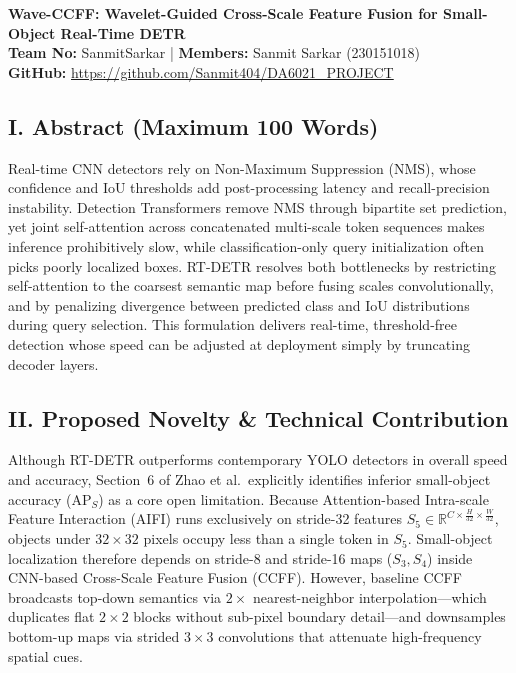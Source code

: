 \documentclass[8pt,a4paper]{article}
\begin{document}
\thispagestyle{empty}

\begin{center}

{\large\bfseries
Wave-CCFF: Wavelet-Guided Cross-Scale Feature Fusion for Small-Object Real-Time DETR}\\[4pt]

\textbf{Team No:} SanmitSarkar
\quad | \quad
\textbf{Members:}
Sanmit Sarkar (230151018)\\[3pt]

\textbf{GitHub:}
\url{https://github.com/Sanmit404/DA6021_PROJECT}

\end{center}

\vspace{-5pt}

\subsection*{I. Abstract (Maximum 100 Words)}
Real-time CNN detectors rely on Non-Maximum Suppression (NMS), whose confidence and IoU thresholds add post-processing latency and recall-precision instability. Detection Transformers remove NMS through bipartite set prediction, yet joint self-attention across concatenated multi-scale token sequences makes inference prohibitively slow, while classification-only query initialization often picks poorly localized boxes. RT-DETR resolves both bottlenecks by restricting self-attention to the coarsest semantic map before fusing scales convolutionally, and by penalizing divergence between predicted class and IoU distributions during query selection. This formulation delivers real-time, threshold-free detection whose speed can be adjusted at deployment simply by truncating decoder layers.

\subsection*{II. Proposed Novelty \& Technical Contribution}
Although RT-DETR outperforms contemporary YOLO detectors in overall speed and accuracy, Section~6 of Zhao et al.\ explicitly identifies inferior small-object accuracy ($\text{AP}_S$) as a core open limitation. Because Attention-based Intra-scale Feature Interaction (AIFI) runs exclusively on stride-32 features $S_5 \in \mathbb{R}^{C \times \frac{H}{32} \times \frac{W}{32}}$, objects under $32 \times 32$ pixels occupy less than a single token in $S_5$. Small-object localization therefore depends on stride-8 and stride-16 maps ($S_3, S_4$) inside CNN-based Cross-Scale Feature Fusion (CCFF). However, baseline CCFF broadcasts top-down semantics via $2\times$ nearest-neighbor interpolation—which duplicates flat $2\times 2$ blocks without sub-pixel boundary detail—and downsamples bottom-up maps via strided $3\times 3$ convolutions that attenuate high-frequency spatial cues.
\end{document}
